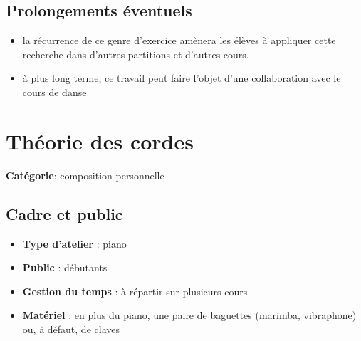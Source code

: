 \documentclass[a4paper,11pt,bibliography=totoc,numbers=noenddot,listof=flat,DIV=11,BCOR=0mm]{scrreprt}%
\begin{document}
%
%

\section*{Prolongements éventuels}
\begin{itemize}
\item la récurrence de ce genre d'exercice amènera les élèves à appliquer cette recherche dans d'autres partitions et d'autres cours. 
\item à plus long terme, ce travail peut faire l'objet d'une collaboration avec le cours de danse 
\end{itemize}



\chapter[Composition personnelle: Théorie des cordes]{Théorie des cordes}
%
%

{\large \textbf{Catégorie}}:
composition personnelle

\section*{Cadre et public}
\begin{itemize}
\item [\textbullet]\textbf{Type d'atelier} : piano

\item [\textbullet]\textbf{Public} : débutants

\item [\textbullet]\textbf{Gestion du temps} : à répartir sur plusieurs cours

\item [\textbullet]\textbf{Matériel} : en plus du piano, une paire de baguettes (marimba, vibraphone) ou, à défaut, de claves
\end{itemize}
\end{document}

